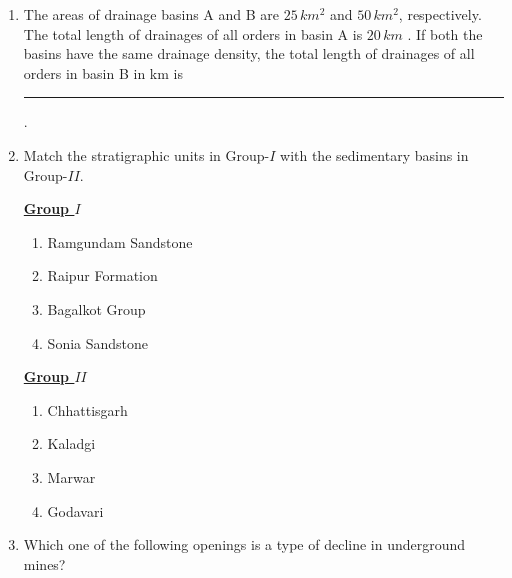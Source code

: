 \documentclass[journal,12pt,onecolumn]{IEEEtran}
\theoremstyle{remark}
\begin{document}
\begin{enumerate}
\item The areas of drainage basins A and B are $25\,km^2$ and $50\,km^2$, respectively. The total length of drainages of all orders in basin A is $20\,km$ . If both the basins have the same drainage density, the total length of drainages of all orders in basin B in km is \rule{3cm}{0.15mm} .
\hfill{}

\item Match the stratigraphic units in Group-$I$ with the sedimentary basins in Group-$II$.

\begin{multicols}{2}
            \underline{\textbf{Group $I$}}
            \begin{enumerate}[start =16]
                \item Ramgundam Sandstone
                \item Raipur Formation
                \item Bagalkot Group
                \item Sonia Sandstone
            \end{enumerate}

            \columnbreak

            \underline{\textbf{Group $II$}}
            \begin{enumerate}
                \item Chhattisgarh
                \item Kaladgi
                \item Marwar
                \item Godavari
            \end{enumerate}
        \end{multicols}
\begin{enumerate}
\end{enumerate}
\hfill{}

\item Which one of the following openings is a type of decline in underground mines?
\begin{enumerate}
\end{enumerate}
\hfill{}


\end{enumerate}
\end{document}

